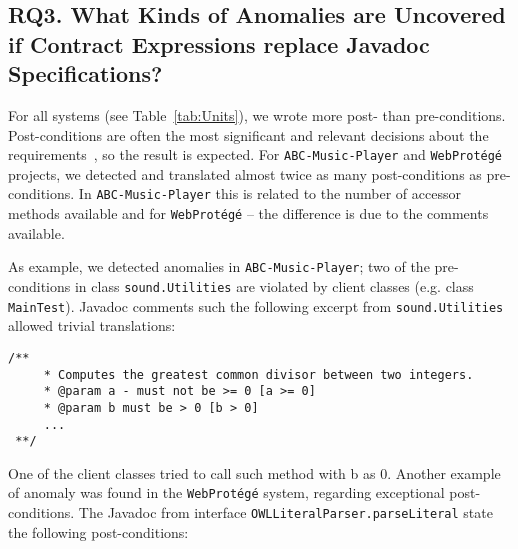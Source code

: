 \subsection{RQ3. What Kinds of Anomalies are Uncovered if Contract Expressions replace Javadoc Specifications?}
\label{rq3}


For all systems (see Table~\ref{tab:Units}), we
wrote more post- than pre-conditions. 
Post-conditions are often the most significant and relevant decisions about the requirements~\cite{Rosenblum,sac2017}, so the result is expected. 
For \texttt{ABC-Music-Player} and
\texttt{WebProt\'{e}g\'{e}} projects, we detected and translated almost twice as many post-conditions as pre-conditions.
In \texttt{ABC-Music-Player} this is related to the number of accessor methods available and for \texttt{WebProt\'{e}g\'{e}} -- the difference is due to the comments available.





As example, we detected anomalies in \texttt{ABC-Mu\-sic-Player}; two of the pre-conditions in class \texttt{sound.Utilities} are violated by client classes (e.g. class \texttt{MainTest}). Javadoc comments such the following excerpt from \texttt{sound.Utilities} allowed trivial translations:
\begin{lstlisting}[basicstyle=\footnotesize\ttfamily,name=figxpi, frame=lines, mathescape=true]
 /**
     * Computes the greatest common divisor between two integers.
     * @param a - must not be >= 0 [a >= 0]
     * @param b must be > 0 [b > 0]
     ...
 **/  
\end{lstlisting}

One of the client classes tried to call such method with b as $0$. Another example of anomaly was found in the \texttt{WebProt\'{e}g\'{e}} system, regarding exceptional post-conditions. 
The Javadoc from interface \texttt{OWLLiteralParser.parseLiteral} state the following post-conditions:

